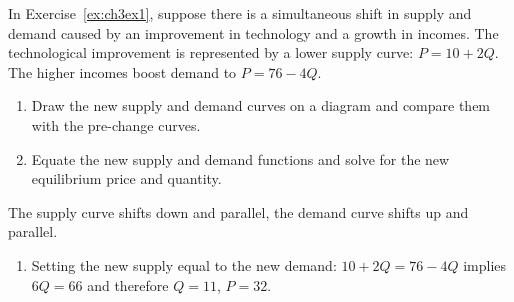 \begin{enumialphparenastyle}
\begin{ex}
\begin{sol}
\begin{center}
	\end{center}
\end{sol}
\end{ex}

\begin{ex}\label{ex:ch3ex4}
In Exercise~\ref{ex:ch3ex1}, suppose there is a simultaneous shift in supply and demand caused by an improvement in technology and a growth in incomes. The technological improvement is represented by a lower supply curve: $P=10+2Q$. The higher incomes boost demand to $P=76-4Q$.
\begin{enumerate}
	\item	Draw the new supply and demand curves on a diagram and compare them with the pre-change curves.
	\item	Equate the new supply and demand functions and solve for the new equilibrium price and quantity.
\end{enumerate}
\begin{sol}
	The supply curve shifts down and parallel, the demand curve shifts up and parallel.
	\begin{enumerate}
		\item	Setting the new supply equal to the new demand: $10+2Q=76-4Q$ implies $6Q=66$ and therefore $Q=11$, $P=32$.
	\end{enumerate}
\end{sol}
\end{ex}


\end{enumialphparenastyle}
